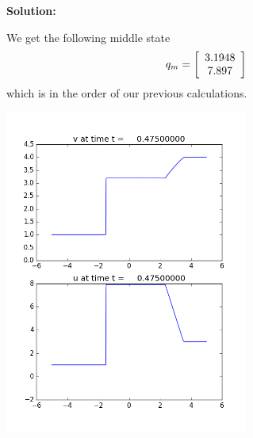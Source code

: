 \documentclass[11pt]{article}
\newenvironment{mat}{\left[ \begin{array}{ccccccccccccc}}{\end{array}\right]}
\newcommand\bcm{\begin{mat}}
\newcommand\ecm{\end{mat}}
\begin{document}
\begin{enumerate}
\vskip 1cm
{\bf Solution:}

We get the following middle state 
\[q_m = \bcm  3.1948\\ 7.897 \ecm\] which is in the order of our previous calculations.


\begin{minipage}{\linewidth}
	\centering
	\includegraphics[width=8cm]{frame2.png}
\end{minipage}

\end{enumerate} 
\end{document}
